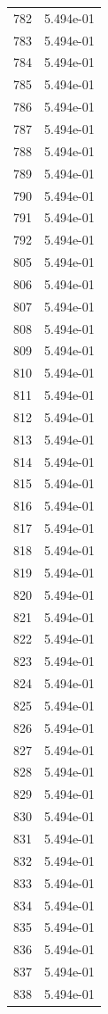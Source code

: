 \documentclass[12pt]{article}
\begin{document}
\begin{longtable}{@{}cc@{}}
782 & 5.494e-01 \\
783 & 5.494e-01 \\
784 & 5.494e-01 \\
785 & 5.494e-01 \\
786 & 5.494e-01 \\
787 & 5.494e-01 \\
788 & 5.494e-01 \\
789 & 5.494e-01 \\
790 & 5.494e-01 \\
791 & 5.494e-01 \\
792 & 5.494e-01 \\
805 & 5.494e-01 \\
806 & 5.494e-01 \\
807 & 5.494e-01 \\
808 & 5.494e-01 \\
809 & 5.494e-01 \\
810 & 5.494e-01 \\
811 & 5.494e-01 \\
812 & 5.494e-01 \\
813 & 5.494e-01 \\
814 & 5.494e-01 \\
815 & 5.494e-01 \\
816 & 5.494e-01 \\
817 & 5.494e-01 \\
818 & 5.494e-01 \\
819 & 5.494e-01 \\
820 & 5.494e-01 \\
821 & 5.494e-01 \\
822 & 5.494e-01 \\
823 & 5.494e-01 \\
824 & 5.494e-01 \\
825 & 5.494e-01 \\
826 & 5.494e-01 \\
827 & 5.494e-01 \\
828 & 5.494e-01 \\
829 & 5.494e-01 \\
830 & 5.494e-01 \\
831 & 5.494e-01 \\
832 & 5.494e-01 \\
833 & 5.494e-01 \\
834 & 5.494e-01 \\
835 & 5.494e-01 \\
836 & 5.494e-01 \\
837 & 5.494e-01 \\
838 & 5.494e-01 \\

\end{longtable}
\end{document}
